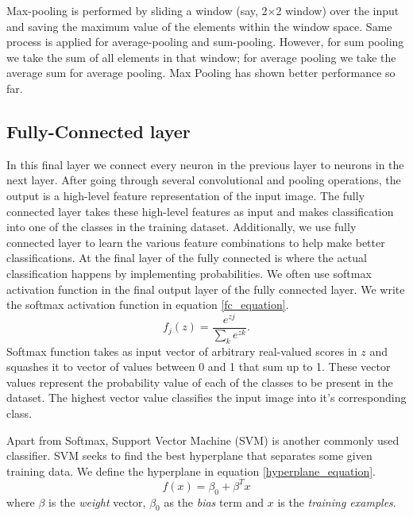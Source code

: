 \documentclass[master]{thesis-uestc}
\begin{document}
Max-pooling is performed by sliding a window (say, 2$\times$2 window) over the input and saving the maximum value of the elements within the window space. Same process is applied for average-pooling and sum-pooling. However, for sum pooling we take the sum of all elements in that window; for average pooling we take the average sum for average pooling. Max Pooling has shown better performance so far.

\subsection*{Fully-Connected layer}
In this final layer we connect every neuron in the previous layer to neurons in the next layer. After going through several convolutional and pooling operations, the output is a high-level feature representation of the input image. The fully connected layer takes these high-level features as input and makes classification into one of the classes in the training dataset. Additionally, we use fully connected layer to learn the various feature combinations to help make better classifications. At the final layer of the fully connected is where the actual classification happens by implementing probabilities. We often use softmax activation function in the final output layer of the fully connected layer. We write the softmax activation function in equation \ref{fc_equation}.
\begin{equation}
    f_j(z) = \frac{e^{zj}}{\sum_{k}^{}e^{zk}}.
\label{fc_equation}
\end{equation}
Softmax function takes as input vector of arbitrary real-valued scores in $z$ and squashes it to vector of values between 0 and 1 that sum up to 1. These vector values represent the probability value of each of the classes to be present in the dataset. The highest vector value classifies the input image into it's corresponding class.

Apart from Softmax, Support Vector Machine (SVM) is another commonly used classifier. SVM seeks to find the best hyperplane that separates some given training data. We define the hyperplane in equation \ref{hyperplane_equation}.
\begin{equation}
    f(x) = \beta_{0} + \beta^{T} x
\label{hyperplane_equation}
\end{equation}
where $\beta$ is the \textit{weight} vector, $\beta_{0}$ as the \textit{bias} term and $x$ is the \textit{training examples}.
\end{document}
